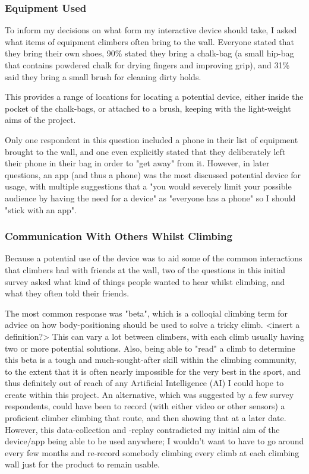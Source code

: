 \subsubsection{Equipment Used}
To inform my decisions on what form my interactive device should take, I asked what items of equipment climbers often bring to the wall.
Everyone stated that they bring their own shoes, 90\% stated they bring a chalk-bag (a small hip-bag that contains powdered chalk for drying fingers and improving grip), and 31\% said they bring a small brush for cleaning dirty holds.

This provides a range of locations for locating a potential device, either inside the pocket of the chalk-bags, or attached to a brush, keeping with the light-weight aims of the project.

Only one respondent in this question included a phone in their list of equipment brought to the wall, and one even explicitly stated that they deliberately left their phone in their bag in order to "get away" from it. 
However, in later questions, an app (and thus a phone) was the most discussed potential device for usage, with multiple suggestions that a "you would severely limit your possible audience by having the need for a device" as "everyone has a phone" so I should "stick with an app".



\subsubsection{Communication With Others Whilst Climbing}
Because a potential use of the device was to aid some of the common interactions that climbers had with friends at the wall, two of the questions in this initial survey asked what kind of things people wanted to hear whilst climbing, and what they often told their friends.

The most common response was "beta", which is a colloqial climbing term for advice on how body-positioning should be used to solve a tricky climb. 
<insert a definition?>
This can vary a lot between climbers, with each climb usually having two or more potential solutions.
Also, being able to "read" a climb to determine this beta is a tough and much-sought-after skill within the climbing community, to the extent that it is often nearly impossible for the very best in the sport, and thus definitely out of reach of any Artificial Intelligence (AI) I could hope to create within this project.
An alternative, which was suggested by a few survey respondents, could have been to record (with either video or other sensors) a proficient climber climbing that route, and then showing that at a later date. 
However, this data-collection and -replay contradicted my initial aim of the device/app being able to be used anywhere; I wouldn't want to have to go around every few months and re-record somebody climbing every climb at each climbing wall just for the product to remain usable.

